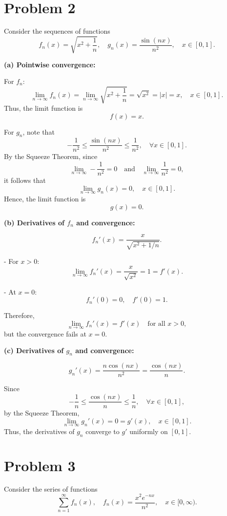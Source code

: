 \documentclass[12pt]{article}
\begin{document}
\section*{Problem 2}
Consider the sequences of functions
\[
	f_n(x) = \sqrt{x^2 + \frac{1}{n}}, \quad g_n(x) = \frac{\sin(nx)}{n^2}, \quad x \in [0,1].
\]

\textbf{(a) Pointwise convergence:}

For \( f_n \):
\[
	\lim_{n \to \infty} f_n(x) = \lim_{n \to \infty} \sqrt{x^2 + \frac{1}{n}} = \sqrt{x^2} = |x| = x, \quad x \in [0,1].
\]
Thus, the limit function is
\[
	f(x) = x.
\]

For \( g_n \), note that
\[
	-\frac{1}{n^2} \le \frac{\sin(nx)}{n^2} \le \frac{1}{n^2}, \quad \forall x \in [0,1].
\]
By the Squeeze Theorem, since
\[
	\lim_{n \to \infty} -\frac{1}{n^2} = 0 \quad \text{and} \quad \lim_{n \to \infty} \frac{1}{n^2} = 0,
\]
it follows that
\[
	\lim_{n \to \infty} g_n(x) = 0, \quad x \in [0,1].
\]
Hence, the limit function is
\[
	g(x) = 0.
\]

\textbf{(b) Derivatives of \(f_n\) and convergence:}

\[
	f_n'(x) = \frac{x}{\sqrt{x^2 + 1/n}}.
\]

- For \( x > 0 \):
\[
	\lim_{n \to \infty} f_n'(x) = \frac{x}{\sqrt{x^2}} = 1 = f'(x).
\]

- At \( x = 0 \):
\[
	f_n'(0) = 0, \quad f'(0) = 1.
\]

Therefore,
\[
	\lim_{n \to \infty} f_n'(x) = f'(x) \quad \text{for all } x > 0,
\]
but the convergence fails at \( x = 0 \).

\textbf{(c) Derivatives of \(g_n\) and convergence:}

\[
	g_n'(x) = \frac{n \cos(nx)}{n^2} = \frac{\cos(nx)}{n}.
\]

Since
\[
	-\frac{1}{n} \le \frac{\cos(nx)}{n} \le \frac{1}{n}, \quad \forall x \in [0,1],
\]
by the Squeeze Theorem,
\[
	\lim_{n \to \infty} g_n'(x) = 0 = g'(x), \quad x \in [0,1].
\]
Thus, the derivatives of \(g_n\) converge to \(g'\) uniformly on \([0,1]\).

\section*{Problem 3}
Consider the series of functions
\[
	\sum_{n=1}^{\infty} f_n(x), \quad f_n(x) = \frac{x^2 e^{-nx}}{n^2}, \quad x \in [0,\infty).
\]
\end{document}
